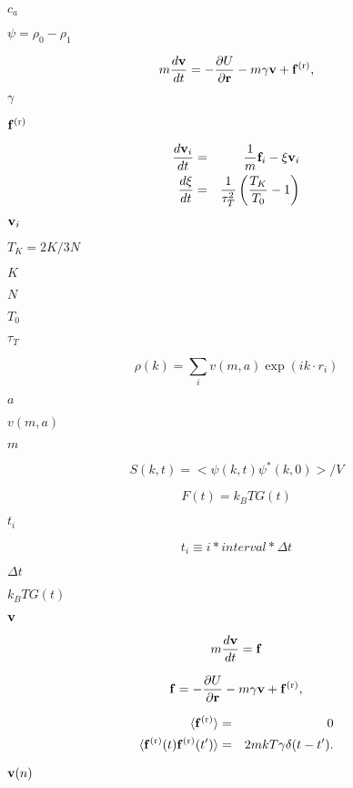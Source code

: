 \documentclass{article}
\begin{document}
$ c_{a} $
\pagebreak

$ \psi = \rho_0 - \rho_1 $
\pagebreak

\[ m\frac{d{\bf v}}{dt} = -\frac{\partial U}{\partial {\bf r}} - m\gamma {\bf v} + {\bf f}^{\rm (r)} , \]
\pagebreak

$\gamma$
\pagebreak

${\bf f}^{\rm (r)}$
\pagebreak

\begin{eqnarray*} \frac{d{\bf v}_{i}}{dt} & = & \frac{1}{m} {\bf f}_{i} - \xi {\bf v}_{i} \\ \frac{d\xi}{dt} & = & \frac{1}{ \tau_{T}^{2} } \left( \frac{T_{K}}{T_{0}} - 1 \right ) \end{eqnarray*}
\pagebreak

${\bf v}_{i}$
\pagebreak

$T_{K} = 2K/3N$
\pagebreak

$K$
\pagebreak

$N$
\pagebreak

$T_{0}$
\pagebreak

$\tau_{T}$
\pagebreak

\[ \rho(k) = \sum_{i} v(m, a)\exp( i k \cdot r_i ) \]
\pagebreak

$a$
\pagebreak

$v(m, a)$
\pagebreak

$m$
\pagebreak

\[ S(k,t) = < \psi(k,t) \psi^{*}(k,0) > / V \]
\pagebreak

\[ F(t) = k_{B}TG(t) \]
\pagebreak

$t_{i}$
\pagebreak

\[ t_i \equiv i*interval*\Delta t \]
\pagebreak

$\Delta t$
\pagebreak

$ k_{B}T G(t) $
\pagebreak

${\bf v}$
\pagebreak

\[ m\frac{d{\bf v}}{dt} = {\bf f} \]
\pagebreak

\[ {\bf f} = -\frac{\partial U}{\partial {\bf r}} - m\gamma {\bf v} + {\bf f}^{\rm (r)} , \]
\pagebreak

\begin{eqnarray*} \langle {\bf f}^{\rm (r)}\rangle & = & 0 \\ \langle {\bf f}^{\rm (r)}(t) {\bf f}^{\rm (r)}(t') \rangle & = & 2 m kT \gamma \delta (t-t') . \end{eqnarray*}
\pagebreak

${\bf v}(n)$
\pagebreak
\end{document}
